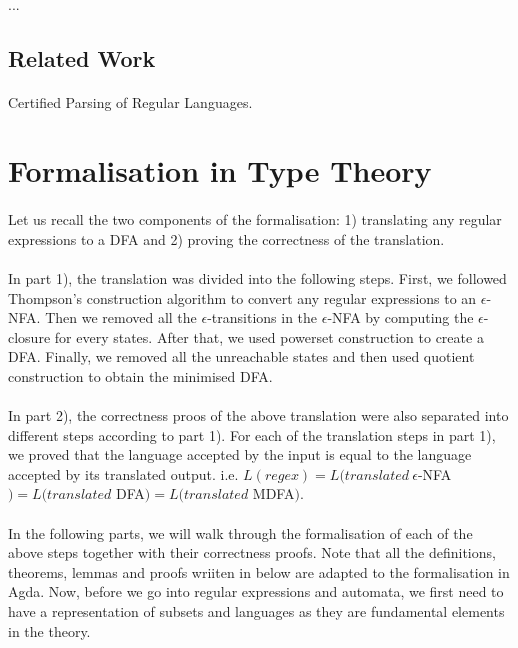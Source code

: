 \documentclass[twoside,openright,final]{bhamthesis}
\begin{document}
\paragraph{} ...

\subsection{Related Work}
\paragraph{} Certified Parsing of Regular Languages. 


\newpage
\section{Formalisation in Type Theory}
\paragraph{} Let us recall the two components of the formalisation: 1) translating any
regular expressions to a DFA and 2) proving the correctness of the
translation. 

\paragraph{} In part 1), the translation was divided into the following steps. First, we
followed Thompson's construction algorithm to convert any regular expressions to an
\(\epsilon\)-NFA. Then we removed all the \(\epsilon\)-transitions in
the \(\epsilon\)-NFA by computing the \(\epsilon\)-closure for every states. After that, we used powerset
construction to create a DFA. Finally, we removed all the unreachable
states and then used quotient construction to obtain the minimised
DFA. 

\paragraph{} In part 2), the correctness proos of the above
translation were also separated into different steps according to part
1). For each of the translation steps in part 1), we proved
that the language accepted by the input is equal to the language
accepted by its translated output. i.e. \(L(regex) =
L(translated\ \epsilon\)-NFA\() = L(translated\) DFA\() =
L(translated\) MDFA\()\). 

\paragraph{} In the following parts, we will walk through the formalisation of
each of the above steps together with their correctness proofs. Note
that all the definitions, theorems, lemmas and proofs wriiten in below
are adapted to the formalisation in Agda. Now, before we go into
regular expressions and automata, we first need to have a
representation of subsets and languages as they are fundamental
elements in the theory. 
\end{document}

